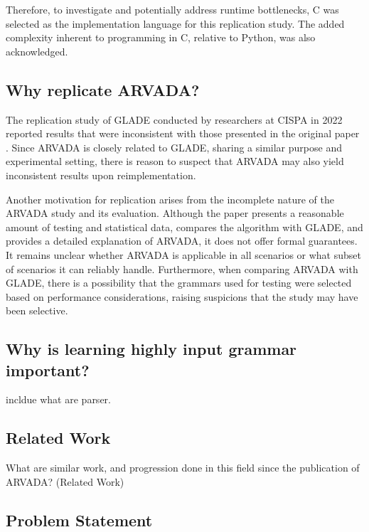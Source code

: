 \vspace{\baselineskip}

Therefore, to investigate and potentially address runtime bottlenecks, C was selected as the implementation language for this replication study. The added complexity inherent to programming in C, relative to Python, was also acknowledged.

\subsection{Why replicate ARVADA?}
The replication study of GLADE \cite{bastaniSynthesizingProgramInput} conducted by researchers at CISPA \cite{bendrissouSynthesizingInputGrammars2022} in 2022 reported results that were inconsistent with those presented in the original paper \cite{bastaniSynthesizingProgramInput}. Since ARVADA is closely related to GLADE, sharing a similar purpose and experimental setting, there is reason to suspect that ARVADA may also yield inconsistent results upon reimplementation.

\vspace{\baselineskip}

Another motivation for replication arises from the incomplete nature of the ARVADA study and its evaluation. Although the paper presents a reasonable amount of testing and statistical data, compares the algorithm with GLADE, and provides a detailed explanation of ARVADA, it does not offer formal guarantees. It remains unclear whether ARVADA is applicable in all scenarios or what subset of scenarios it can reliably handle. Furthermore, when comparing ARVADA with GLADE, there is a possibility that the grammars used for testing were selected based on performance considerations, raising suspicions that the study may have been selective.

\subsection{Why is learning highly input grammar important?}
incldue what are parser.

\subsection{Related Work}

What are similar work, and progression done in this field since the publication of ARVADA? (Related Work)

\subsection{Problem Statement}

